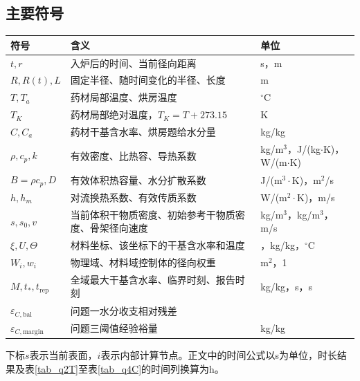 \subsection{主要符号}
\begin{center}\small
\renewcommand{\arraystretch}{1.13}
\begin{tabular}{p{2.4cm}p{7.5cm}>{\raggedright\arraybackslash}p{3cm}}
\toprule 符号 & 含义 & 单位 \\\midrule
$t,r$ & 入炉后的时间、当前径向距离 & s，m \\
$R,R(t),L$ & 固定半径、随时间变化的半径、长度 & m \\
$T,T_a$ & 药材局部温度、烘房温度 & $^\circ$C \\
$T_K$ & 药材局部绝对温度，$T_K=T+273.15$ & K \\
$C,C_a$ & 药材干基含水率、烘房题给水分量 & kg/kg \\
$\rho,c_p,k$ & 有效密度、比热容、导热系数 & kg/m$^3$，J/(kg$\cdot$K)，W/(m$\cdot$K) \\
$B=\rho c_p,D$ & 有效体积热容量、水分扩散系数 & J/(m$^3\cdot$K)，m$^2$/s \\
$h,h_m$ & 对流换热系数、有效传质系数 & W/(m$^2\cdot$K)，m/s \\
$s,s_0,v$ & 当前体积干物质密度、初始参考干物质密度、骨架径向速度 & kg/m$^3$，kg/m$^3$，m/s \\
$\xi,U,\Theta$ & 材料坐标、该坐标下的干基含水率和温度 & 1，kg/kg，$^\circ$C \\
$W_i,w_i$ & 物理域、材料域控制体的径向权重 & m$^2$，1 \\
$M,t_*,t_{\mathrm{rep}}$ & 全域最大干基含水率、临界时刻、报告时刻 & kg/kg，s，s \\
$\varepsilon_{C,\mathrm{bal}}$ & 问题一水分收支相对残差 & 1 \\
$\varepsilon_{C,\mathrm{margin}}$ & 问题三阈值经验裕量 & kg/kg \\
\bottomrule
\end{tabular}\end{center}
下标$s$表示当前表面，$i$表示内部计算节点。正文中的时间公式以s为单位，时长结果及表\ref{tab_q2T}至表\ref{tab_q4C}的时间列换算为h。
